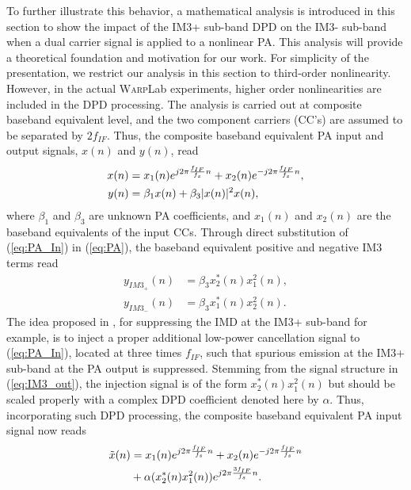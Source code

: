 To further illustrate this behavior, a mathematical analysis is introduced in this section to show the impact of the IM3+ sub-band DPD on the IM3- sub-band when a dual carrier signal is applied to a nonlinear PA. This analysis will provide a theoretical foundation and motivation for our work. For simplicity of the presentation, we restrict our analysis in this section to third-order nonlinearity. However, in the actual \textsc{Warp}Lab experiments, higher order nonlinearities are included in the DPD processing.
The analysis is carried out at composite baseband equivalent level, and the two component carriers (CC's) are assumed to be separated by $2 f_{IF}$. Thus, the composite baseband equivalent PA input and output signals, $x(n)$ and $y(n)$, read
\begin{align}
\small
x(n) &= x_1(n) e^{j 2\pi \frac{f_{IF}}{f_s} n} + x_2(n) e^{-j 2\pi \frac{f_{IF}}{f_s} n}, \label{eq:PA_In} \\
y(n) &= \beta_1 x(n) + \beta_3 |x(n)|^2 x(n), \label{eq:PA}
\end{align}
\normalsize 
where $\beta_1$ and $\beta_3$ are unknown PA coefficients, and $x_1(n)$ and $x_2(n)$ are the baseband equivalents of the input CCs. Through direct substitution of (\ref{eq:PA_In}) in (\ref{eq:PA}), the baseband equivalent positive and negative IM3 terms read
\begin{align}
y_{IM3_+}(n) &= \beta_3  x_2^*(n)x_1^2(n), \label{eq:IM3_out} \\
y_{IM3_-}(n) &= \beta_3  x_1^*(n)x_2^2(n). 
\label{eq:IM3_neg_out}
\end{align}
\normalsize
The idea proposed in \cite{ICASSP2014}, for suppressing the IMD at the IM3+ sub-band for example, is to inject a proper additional low-power cancellation signal to (\ref{eq:PA_In}), located at three times $f_{IF}$, such that spurious emission at the IM3+ sub-band at the PA output is suppressed. Stemming from the signal structure in (\ref{eq:IM3_out}), the injection signal is of the form $x_2^*(n)x_1^2(n)$ but should be scaled properly with a complex DPD coefficient denoted here by $\alpha$. Thus, incorporating such DPD processing, the composite baseband equivalent PA input signal now reads
\begin{align}
\small
\tilde{x}(n) &= x_1(n) e^{j 2\pi \frac{f_{IF}}{f_s} n} + x_2(n) e^{-j 2\pi \frac{f_{IF}}{f_s} n} \nonumber\\ 
&+ \alpha(x_2^*(n)x_1^2(n)) e^{j 2\pi \frac{3 f_{IF}}{f_s} n}. \label{eq:PA_In_DPD}
\end{align}
\normalsize
